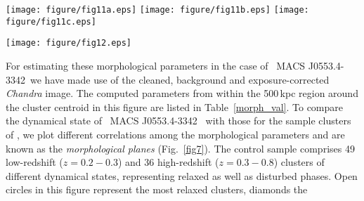 \documentclass[useASM,usenatbib]{mn2e}
\newcommand{\mac}{\rm~MACS J0553.4-3342}
\begin{document}
\begin{figure*}
\texttt{[image: figure/fig11a.eps]}
\texttt{[image: figure/fig11b.eps]}
\texttt{[image: figure/fig11c.eps]}
\caption {The morphological parameter planes for the control
  sample of galaxy clusters taken from \citealt{2015A&A...575A.127P}
  for identifying their dynamical states. 
  Open circles in all the three plots
  represent the `most relaxed' clusters, diamonds the `relaxed'
  clusters, pluses the `non-relaxed', while the `most disturbed'
  clusters are indicated by crosses. The squares are clusters with
  radio halos and known to be merging clusters. The 
  position of \mac\ in these plots is indicated by a green star.
  \citep{2009A&A...507.1257G}.}
\label{fig7}
\end{figure*}
\begin{figure*}
\centering
\texttt{[image: figure/fig12.eps]}
\caption {Morphology parameters vs. temperature for the sample
  clusters as in Fig.~\ref{fig7}. We subdivided the morphology
  parameter vs temperature plot into three regions: (1) dynamically
  relaxed clusters, (2) radio-quiet (no radio halo) merger clusters,
  and (3) radio-loud (with radio halo) merger clusters. The green star
  represents \mac\ while a square within a green circle shows the `Bullet
  Cluster' 1E 0657-56.}
\label{fig8}
\end{figure*}
For estimating these morphological parameters in the case of \mac\ we
have made use of the cleaned, background and exposure-corrected
\textit{Chandra} image. The computed parameters from within the
500\,kpc region around the cluster centroid in this figure are listed
in Table~\ref{morph_val}. To compare the dynamical state of \mac~ with
those for the sample clusters of \cite{2015A&A...575A.127P}, we plot
different correlations among the morphological parameters and are
known as the \textit{morphological planes} (Fig.~\ref{fig7}). The
control sample comprises 49 low-redshift ($z = 0.2-0.3$) and 36
high-redshift ($z = 0.3 - 0.8$) clusters of different dynamical
states, representing relaxed as well as disturbed phases. Open circles
in this figure represent the most relaxed clusters, diamonds the
\end{document}
